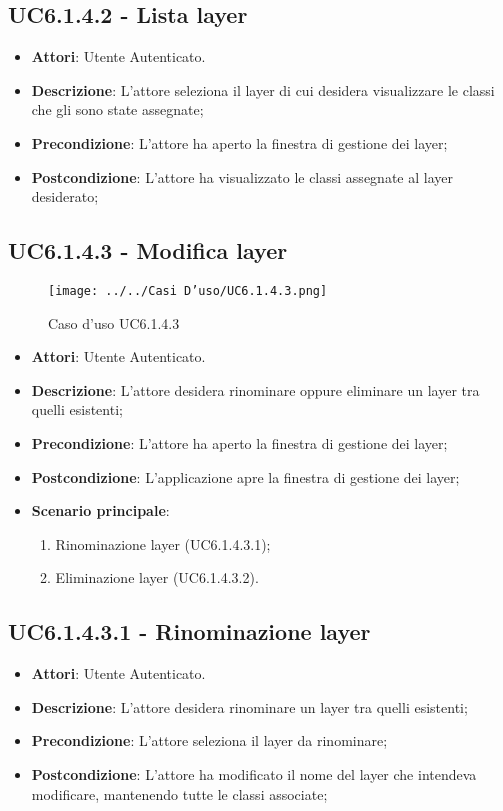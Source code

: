 \subsection{UC6.1.4.2 - Lista layer} 
\label{ssec:UC6.1.4.2} 
\begin{itemize} 
\item \textbf{Attori}: Utente Autenticato.
\item \textbf{Descrizione}: L'attore seleziona il layer di cui desidera visualizzare le classi che gli sono state assegnate;
\item \textbf{Precondizione}: L'attore ha aperto la finestra di gestione dei layer;
\item \textbf{Postcondizione}: L'attore ha visualizzato le classi assegnate al layer desiderato;
\end{itemize} 
\subsection{UC6.1.4.3 - Modifica layer} 
\label{ssec:UC6.1.4.3} 
\begin{figure}[h!] 
\centering 
\texttt{[image: ../../Casi D'uso/UC6.1.4.3.png]} 
\caption{Caso d'uso UC6.1.4.3} 
 \end{figure} 
\begin{itemize} 
\item \textbf{Attori}: Utente Autenticato.
\item \textbf{Descrizione}: L'attore desidera rinominare oppure eliminare un layer tra quelli esistenti;
\item \textbf{Precondizione}: L'attore ha aperto la finestra di gestione dei layer;
\item \textbf{Postcondizione}: L'applicazione apre la finestra di gestione dei layer;
\item \textbf{Scenario principale}: \begin{enumerate}\item Rinominazione layer (UC6.1.4.3.1);\item Eliminazione layer (UC6.1.4.3.2). 
 \end{enumerate}
\end{itemize} 
\subsection{UC6.1.4.3.1 - Rinominazione layer} 
\label{ssec:UC6.1.4.3.1} 
\begin{itemize} 
\item \textbf{Attori}: Utente Autenticato.
\item \textbf{Descrizione}: L'attore desidera rinominare un layer tra quelli esistenti;
\item \textbf{Precondizione}: L'attore seleziona il layer da rinominare;
\item \textbf{Postcondizione}: L'attore ha modificato il nome del layer che intendeva modificare, mantenendo tutte le classi associate;
\end{itemize} 
